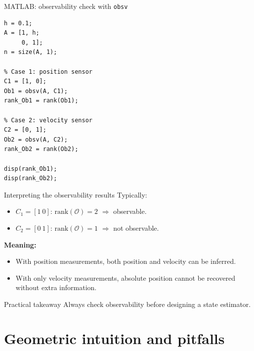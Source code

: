 \documentclass[aspectratio=169,10pt]{beamer}
\newcommand{\Ocal}{\mathcal{O}}
\begin{document}
\begin{frame}[fragile]{MATLAB: observability check with \texttt{obsv}}
\begin{lstlisting}[caption={Comparing observability for two sensor configurations.}]
h = 0.1;
A = [1, h;
     0, 1];
n = size(A, 1);

% Case 1: position sensor
C1 = [1, 0];
Ob1 = obsv(A, C1);
rank_Ob1 = rank(Ob1);

% Case 2: velocity sensor
C2 = [0, 1];
Ob2 = obsv(A, C2);
rank_Ob2 = rank(Ob2);

disp(rank_Ob1);
disp(rank_Ob2);
\end{lstlisting}
\end{frame}

\begin{frame}{Interpreting the observability results}
Typically:
\begin{itemize}
  \item \(C_1=[1\ 0]\): \(\mathrm{rank}(\Ocal)=2\) \(\Rightarrow\) observable.
  \item \(C_2=[0\ 1]\): \(\mathrm{rank}(\Ocal)=1\) \(\Rightarrow\) not observable.
\end{itemize}

\textbf{Meaning:}
\begin{itemize}
  \item With position measurements, both position and velocity can be inferred.
  \item With only velocity measurements, absolute position cannot be recovered without extra information.
\end{itemize}

\begin{notebox}{Practical takeaway}
Always check observability before designing a state estimator.
\end{notebox}
\end{frame}


\section{Geometric intuition and pitfalls}
\end{document}
